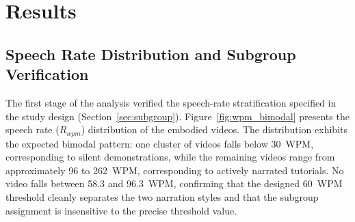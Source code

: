 \documentclass[fleqn,10pt]{JLA_article} %
\begin{document}

\section{Results}
\label{sec:results}
\datatable
{}\ytdatatable

\subsection{Speech Rate Distribution and Subgroup Verification}

The first stage of the analysis verified the speech-rate stratification specified in the study design (Section~\ref{sec:subgroup}). Figure~\ref{fig:wpm_bimodal} presents the speech rate ($R_{wpm}$) distribution of the embodied videos. The distribution exhibits the expected bimodal pattern: one cluster of videos falls below 30~WPM, corresponding to silent demonstrations, while the remaining videos range from approximately 96 to 262~WPM, corresponding to actively narrated tutorials. No video falls between 58.3 and 96.3~WPM, confirming that the designed 60~WPM threshold cleanly separates the two narration styles and that the subgroup assignment is insensitive to the precise threshold value.
\end{document}
